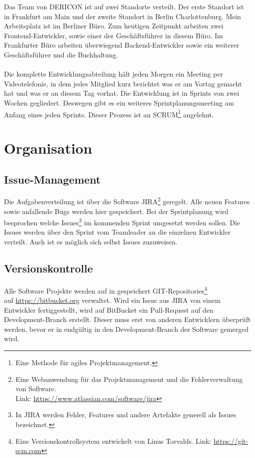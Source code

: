 \documentclass[chapterprefix=false, 12pt, a4paper, oneside, parskip=half, listof=totoc, bibliography=totoc, numbers=noendperiod]{scrbook}
\begin{document}
    Das Team von DERICON ist auf zwei Standorte verteilt. Der erste Standort ist in Frankfurt am Main und der zweite Standort in Berlin Charlottenburg.
    Mein Arbeitsplatz ist im Berliner Büro. Zum heutigen Zeitpunkt arbeiten zwei Frontend-Entwickler, sowie einer der Geschäftsführer in diesem Büro.
    Im Frankfurter Büro arbeiten überwiegend Backend-Entwickler sowie ein weiterer Geschäftsführer und die Buchhaltung.
    \\ \\
    Die komplette Entwicklungsabteilung hält jeden Morgen ein Meeting per Videotelefonie, in dem jedes Mitglied kurz berichtet
    was er am Vortag gemacht hat und was er an diesem Tag vorhat.
    Die Entwicklung ist in Sprints von zwei Wochen gegliedert. Deswegen gibt es ein weiteres Sprintplanungsmeeting am Anfang eines jeden Sprints.
    Dieser Prozess ist an SCRUM\footnote{Eine Methode für agiles Projektmanagement.} angelehnt.

    \section{Organisation}

    \subsection{Issue-Management}

    Die Aufgabenverteilung ist über die Software JIRA\footnote{Eine Webanwendung für das Projektmanagement und die Fehlerverwaltung von Software. \\ Link: \url{https://www.atlassian.com/software/jira}} geregelt.
    Alle neuen Features sowie anfallende Bugs werden hier gespeichert.
    Bei der Sprintplanung wird besprochen welche Issues\footnote{In JIRA werden Fehler, Features und andere Artefakte generell als Issues bezeichnet.}
    im kommenden Sprint umgesetzt werden sollen. Die Issues werden über den Sprint vom Teamleader an die einzelnen Entwickler verteilt. Auch ist es möglich sich selbst Issues zuzuweisen.

    \pagebreak

    \subsection{Versionskontrolle}

    Alle Software Projekte werden auf in gespeichert GIT-Repositories\footnote{Eine Versionskontrollsystem entwickelt von Linus Torvalds. Link: \url{https://git-scm.com}} \\
    auf \url{https://bitbucket.org} verwaltet.
    Wird ein Issue aus JIRA von einem Entwickler fertiggestellt, wird auf BitBucket ein Pull-Request auf den Development-Branch erstellt.
    Dieser muss erst von anderen Entwicklern überprüft werden, bevor er in endgültig in den Development-Branch der Software
    gemerged wird.
\end{document}
